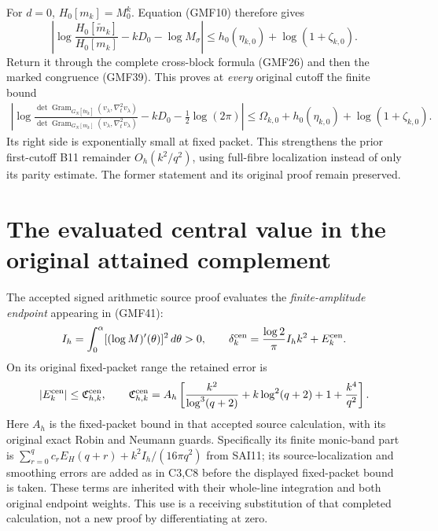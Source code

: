 \documentclass[11pt]{article}
\DeclareMathOperator{\Gram}{Gram}
\begin{document}
For \(d=0\), \(H_0[m_k]=M_0^k\).
Equation (GMF10) therefore gives
\[
 \left|\log\frac{H_0[\widetilde m_k]}{H_0[m_k]}
            -kD_0-\log M_\sigma\right|
 \le h_0(\eta_{k,0})+\log(1+\zeta_{k,0}).
\]
Return it through the complete cross-block formula
(GMF26) and then the marked congruence (GMF39).
This proves at \emph{every} original cutoff the finite bound
\begin{equation}\tag{GMF44}
\begin{split}
 \left|
 \log\frac{\det\Gram_{G_N[\widetilde m_k]}(v_\lambda,\nabla_t^2v_\lambda)}
              {\det\Gram_{G_N[m_k]}(v_\lambda,\nabla_t^2v_\lambda)}
       -kD_0-\tfrac12\log(2\pi)
 \right|
 \le\Omega_{k,0}+h_0(\eta_{k,0})+\log(1+\zeta_{k,0}).
\end{split}
\end{equation}
Its right side is exponentially small at fixed packet.
This strengthens the prior first-cutoff B11 remainder
\(O_h(k^2/q^2)\), using full-fibre localization instead
of only its parity estimate.  The former statement and
its original proof remain preserved.

\section{The evaluated central value in the original attained complement}

The accepted signed arithmetic source proof
\cite[C32 and SAI1--SAI11]{signedCentral} evaluates the
\emph{finite-amplitude endpoint} appearing in (GMF41):
\[
 I_h=\int_0^\alpha[(\log M)'(\theta)]^2\,d\theta>0,\qquad
 \delta_k^{\rm cen}
  =\frac{\log2}{\pi}I_h k^2+E_k^{\rm cen}.
\]
On its original fixed-packet range the retained error is
\[
 |E_k^{\rm cen}|
 \le \mathfrak C_{h,k}^{\rm cen},\qquad
 \mathfrak C_{h,k}^{\rm cen}
 =A_h\left[
 \frac{k^2}{\log^3(q+2)}+k\log^2(q+2)+1+\frac{k^4}{q^2}
 \right].
\]
Here \(A_h\) is the fixed-packet bound in that accepted
source calculation, with its original exact Robin and
Neumann guards.  Specifically its finite monic-band part
is \(\sum_{r=0}^q c_rE_H(q+r)+k^2I_h/(16\pi q^2)\)
from SAI11; its source-localization and smoothing errors
are added as in C3,C8 before the displayed fixed-packet
bound is taken.  These terms are inherited with their
whole-line integration and both original endpoint weights.
This use is a receiving substitution of that completed
calculation, not a new proof by differentiating at zero.
\end{document}
